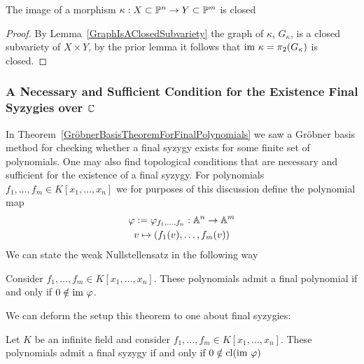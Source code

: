         \begin{lemma}
            The image of a morphism $\kappa : X \subset \mathbb{P}^n\rightarrow Y \subset \mathbb{P}^m$ is closed 
        \end{lemma}
        \begin{proof}\label{ImageOfBiProjectiveMorphismIsClosed}
            By Lemma~\ref{GraphIsAClosedSubvariety} the graph of $\kappa$, $G_\kappa$, is a closed subvariety of $X\times Y$, by the prior lemma it follows that $\im \ \kappa = \pi_2(G_\kappa)$ is closed. 
        \end{proof}
        \subsubsection{A Necessary and Sufficient Condition for the Existence Final Syzygies over $\mathbb{C}$}
        In Theorem~\ref{GröbnerBasisTheoremForFinalPolynomials} we saw a Gröbner basis method for checking whether a final syzygy exists for some finite set of polynomials. One may also find topological conditions that are necessary and sufficient for the existence of a final syzygy. For polynomials $f_1,\dots,f_m\in K[x_1,\dots,x_n]$ we for purposes of this discussion define the polynomial map
        \begin{gather*}
            \varphi := \varphi_{f_1,\dots,f_n} : \mathbb{A}^n \rightarrow \mathbb{A}^m\\
            v\mapsto (f_1(v),\dots,f_m(v))
        \end{gather*}
        We can state the weak Nullstellensatz in the following way
        \begin{theorem}
            Consider $f_1,\dots,f_m\in K[x_1,\dots,x_n]$. These polynomials admit a final polynomial if and only if $0\notin \mathrm{im}\ \varphi$.
        \end{theorem}
        We can deform the setup this theorem to one about final syzygies:
        \begin{lemma}\label{GeometricFinalSyzygyCondition}
            Let $K$ be an infinite field and consider $f_1,\dots,f_m\in K[x_1,\dots,x_n]$. These polynomials admit a final syzygy if and only if $0\notin \mathrm{cl}(\mathrm{im}\ \varphi)$
        \end{lemma}
